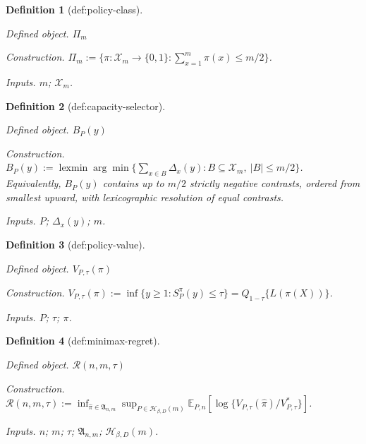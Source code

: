 \documentclass{article}
\newtheorem{definition}{Definition}
\begin{document}
\begin{definition}[def:policy-class]\label{def:policy-class}
\par\smallskip\noindent\emph{Defined object.} \(\Pi_m\)
\par\smallskip\noindent\emph{Construction.} \(\Pi_m:=\{\pi:\mathcal X_m\to\{0,1\}:\sum_{x=1}^m\pi(x)\le m/2\}\).
\par\smallskip\noindent\emph{Inputs.} \(m\); \(\mathcal X_m\).
\end{definition}

\begin{definition}[def:capacity-selector]\label{def:capacity-selector}
\par\smallskip\noindent\emph{Defined object.} \(B_P(y)\)
\par\smallskip\noindent\emph{Construction.} \(B_P(y):=\operatorname{lexmin}\arg\min\{\sum_{x\in B}\Delta_x(y):B\subseteq\mathcal X_m,\ |B|\le m/2\}\). Equivalently, \(B_P(y)\) contains up to \(m/2\) strictly negative contrasts, ordered from smallest upward, with lexicographic resolution of equal contrasts.
\par\smallskip\noindent\emph{Inputs.} \(P\); \(\Delta_x(y)\); \(m\).
\end{definition}

\begin{definition}[def:policy-value]\label{def:policy-value}
\par\smallskip\noindent\emph{Defined object.} \(V_{P,\tau}(\pi)\)
\par\smallskip\noindent\emph{Construction.} \(V_{P,\tau}(\pi):=\inf\{y\ge1:S_P^{\pi}(y)\le\tau\}=Q_{1-\tau}\{L(\pi(X))\}\).
\par\smallskip\noindent\emph{Inputs.} \(P\); \(\tau\); \(\pi\).
\end{definition}

\begin{definition}[def:minimax-regret]\label{def:minimax-regret}
\par\smallskip\noindent\emph{Defined object.} \(\mathcal R(n,m,\tau)\)
\par\smallskip\noindent\emph{Construction.} \(\mathcal R(n,m,\tau):=\inf_{\widehat\pi\in\mathfrak A_{n,m}}\sup_{P\in\mathcal H_{\beta,D}(m)}\mathbb E_{P,n}[\log\{V_{P,\tau}(\widehat\pi)/V^*_{P,\tau}\}]\).
\par\smallskip\noindent\emph{Inputs.} \(n\); \(m\); \(\tau\); \(\mathfrak A_{n,m}\); \(\mathcal H_{\beta,D}(m)\).
\end{definition}
\end{document}
